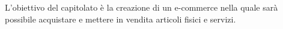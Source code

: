 L’obiettivo del capitolato è la creazione di un e-commerce nella quale sar\`{a} possibile acquistare e mettere in vendita articoli fisici e servizi.
